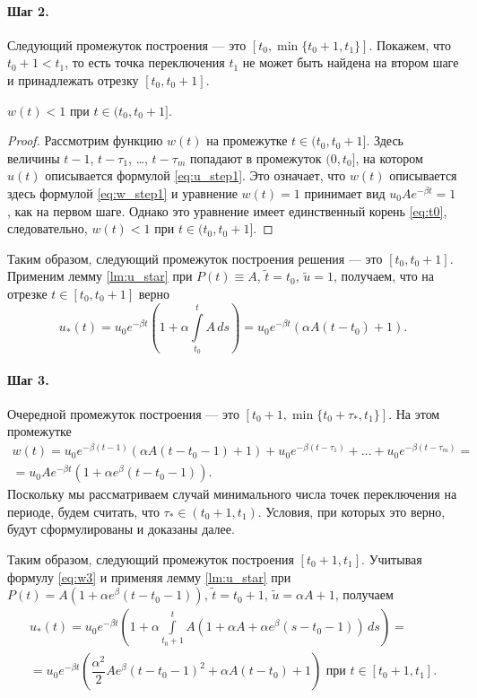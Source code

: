 \paragraph{Шаг 2.} Следующий промежуток построения --- это 
$[t_0, \min\{t_0 + 1, t_1\}]$.
Покажем, что $t_0+1 < t_1$, то есть точка переключения $t_1$ не может быть найдена на втором шаге и принадлежать отрезку $[t_0, t_0 + 1]$.
\begin{lemma}
	\label{lm:u_step2}
	$w(t)<1$ при $t \in (t_0, t_0 + 1]$.
\end{lemma}
\begin{proof}
	Рассмотрим функцию $w(t)$ на промежутке $t \in (t_0,t_0+1]$. Здесь величины $t - 1$, $t - \tau_1$, \dots, $t - \tau_m$ попадают в промежуток $(0, t_0]$, на котором $u(t)$ описывается формулой \eqref{eq:u_step1}. Это означает, что $w(t)$ описывается здесь формулой \eqref{eq:w_step1} и уравнение $w(t) = 1$ принимает вид $u_0 A e^{-\beta t} = 1$, как на первом шаге. Однако это  уравнение имеет единственный корень \eqref{eq:t0}, следовательно, $w(t) < 1$ при $t \in (t_0, t_0 + 1]$.
\end{proof}

Таким образом, следующий промежуток построения решения --- это $[t_0,t_0+1]$. Применим лемму \eqref{lm:u_star} при $P(t)\equiv A$, $\tilde{t} = t_0$, $\tilde{u} = 1$, получаем, что на отрезке $t \in [t_0, t_0 + 1]$ верно
\begin{equation}
	\label{eq:u_step2}
	u_*(t)= u_0 e^{-\beta t}\left(1 + \alpha\int\limits_{t_0}^t A\,ds \right) = u_0 e^{-\beta t}(\alpha A(t-t_0) + 1).
\end{equation}

\paragraph{Шаг 3.} Очередной промежуток построения --- это $[t_0 + 1, \min\{t_0 + \tau_*, t_1\}]$. На этом промежутке
%
\begin{multline}
	\label{eq:w3}
	w(t)=u_0 e^{-\beta (t-1)}(\alpha A(t-t_0-1)+1)+u_0 e^{-\beta(t - \tau_1)} + \ldots + u_0 e^{-\beta(t-\tau_m)} = \\
	= u_0 A e^{-\beta t}(1 + \alpha e^{\beta}(t - t_0 - 1)).
\end{multline}
Поскольку мы рассматриваем случай минимального числа точек переключения на периоде, будем считать, что $\tau_* \in (t_0 + 1, t_1)$. Условия, при которых это верно, будут сформулированы и доказаны далее.

Таким образом, следующий промежуток построения $[t_0 + 1, t_1]$. Учитывая формулу \eqref{eq:w3} и применяя лемму \ref{lm:u_star} при $P(t) = A(1 + \alpha e^\beta(t - t_0 - 1))$, $\tilde{t} = t_0+1$, $\tilde{u}=\alpha A+1$, получаем
\begin{multline}
	\label{eq:u_step3}
	u_*(t) = u_0 e^{-\beta t}\left(1 + \alpha\int\limits_{t_0 + 1}^t A(1 + \alpha A + \alpha e^\beta(s - t_0 - 1)) \,ds \right) =\\= u_0 e^{-\beta t}\left(\dfrac{\alpha^2}{2}Ae^{\beta}(t-t_0-1)^2+\alpha A(t-t_0)+1\right)\text{ при }t\in[t_0+1,t_1].
\end{multline}

